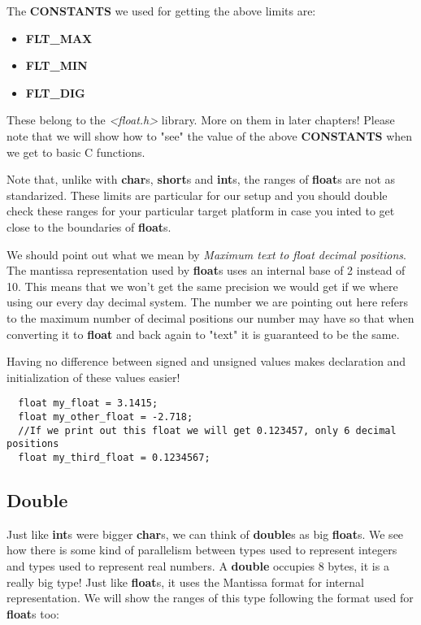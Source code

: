 \documentclass[12pt]{book}
\begin{document}
The \textbf{CONSTANTS} we used for getting the above limits are:

\begin{itemize}
  \item \textbf{FLT\_MAX}
  \item \textbf{FLT\_MIN}
  \item \textbf{FLT\_DIG}
\end{itemize}

These belong to the \textit{\textless float.h\textgreater} library. More on them in later chapters! Please note that we will show how to "see" the value of the above \textbf{CONSTANTS} when we get to basic C functions.

Note that, unlike with \textbf{char}s, \textbf{short}s and \textbf{int}s, the ranges of \textbf{float}s are not as standarized. These limits are particular for our setup and you should double check these ranges for your particular target platform in case you inted to get close to the boundaries of \textbf{float}s.

We should point out what we mean by \textit{Maximum text to float decimal positions}. The mantissa representation used by \textbf{float}s uses an internal base of 2 instead of 10. This means that we won't get the same precision we would get if we where using our every day decimal system. The number we are pointing out here refers to the maximum number of decimal positions our number may have so that when converting it to \textbf{float} and back again to "text" it is guaranteed to be the same.


Having no difference between signed and unsigned values makes declaration and initialization of these values easier!

\begin{verbatim}
  float my_float = 3.1415;
  float my_other_float = -2.718;
  //If we print out this float we will get 0.123457, only 6 decimal positions
  float my_third_float = 0.1234567;
\end{verbatim}

\subsection{Double}

Just like \textbf{int}s were bigger \textbf{char}s, we can think of \textbf{double}s as big \textbf{float}s. We see how there is some kind of parallelism between types used to represent integers and types used to represent real numbers. A \textbf{double} occupies 8 bytes, it is a really big type! Just like \textbf{float}s, it uses the Mantissa format for internal representation. We will show the ranges of this type following the format used for \textbf{float}s too:
\end{document}

